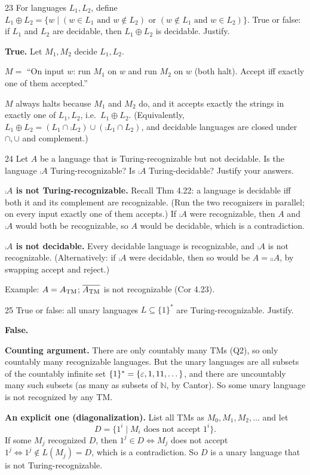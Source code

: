 \begin{question}{23}
For languages $L_1,L_2$, define $L_1\oplus L_2=\{w\mid (w\in L_1 \text{ and } w\notin L_2) \text{ or } (w\notin L_1 \text{ and } w\in L_2)\}$. True or false: if $L_1$ and $L_2$ are decidable, then $L_1\oplus L_2$ is decidable. Justify.
\end{question}
\begin{soln}
\textbf{True.} Let $M_1,M_2$ decide $L_1,L_2$.

$M=$ ``On input $w$: run $M_1$ on $w$ and run $M_2$ on $w$ (both halt). Accept iff exactly one of them accepted.''

$M$ always halts because $M_1$ and $M_2$ do, and it accepts exactly the strings in exactly one of $L_1,L_2$, i.e.\ $L_1\oplus L_2$.
(Equivalently, $L_1\oplus L_2=(L_1\cap\comp{L_2})\cup(\comp{L_1}\cap L_2)$, and decidable languages are closed under $\cap,\cup$ and complement.)
\end{soln}

\begin{question}{24}
Let $A$ be a language that is Turing-recognizable but not decidable. Is the language $\comp A$ Turing-recognizable? Is $\comp A$ Turing-decidable? Justify your answers.
\end{question}
\begin{soln}
\textbf{$\comp A$ is not Turing-recognizable.} Recall Thm 4.22: a language is decidable iff both it and its complement are recognizable. (Run the two recognizers in parallel; on every input exactly one of them accepts.) If $\comp A$ were recognizable, then $A$ and $\comp A$ would both be recognizable, so $A$ would be decidable, which is a contradiction.

\textbf{$\comp A$ is not decidable.} Every decidable language is recognizable, and $\comp A$ is not recognizable. (Alternatively: if $\comp A$ were decidable, then so would be $A=\comp{\comp A}$, by swapping accept and reject.)

Example: $A=A_{\mathrm{TM}}$; $\overline{A_{\mathrm{TM}}}$ is not recognizable (Cor 4.23).
\end{soln}

\begin{question}{25}
True or false: all unary languages $L\subseteq\{1\}^*$ are Turing-recognizable. Justify.
\end{question}
\begin{soln}
\textbf{False.}

\textbf{Counting argument.} There are only countably many TMs (Q2), so only countably many recognizable languages. But the unary languages are all subsets of the countably infinite set $\{1\}^*=\{\varepsilon,1,11,\dots\}$, and there are uncountably many such subsets (as many as subsets of $\mathbb N$, by Cantor). So some unary language is not recognized by any TM.

\textbf{An explicit one (diagonalization).} List all TMs as $M_0,M_1,M_2,\dots$ and let
\[
D=\{1^i\mid M_i \text{ does not accept } 1^i\}.
\]
If some $M_j$ recognized $D$, then $1^j\in D\iff M_j$ does not accept $1^j\iff 1^j\notin L(M_j)=D$, which is a contradiction. So $D$ is a unary language that is not Turing-recognizable.
\end{soln}

